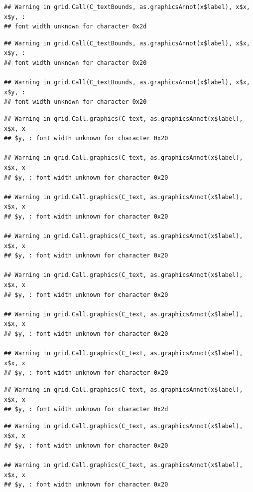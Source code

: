 \documentclass[]{article}
\theoremstyle{definition}
\theoremstyle{definition}
\theoremstyle{definition}
\theoremstyle{remark}
\begin{document}
\begin{verbatim}
## Warning in grid.Call(C_textBounds, as.graphicsAnnot(x$label), x$x, x$y, :
## font width unknown for character 0x2d
\end{verbatim}

\begin{verbatim}
## Warning in grid.Call(C_textBounds, as.graphicsAnnot(x$label), x$x, x$y, :
## font width unknown for character 0x20

## Warning in grid.Call(C_textBounds, as.graphicsAnnot(x$label), x$x, x$y, :
## font width unknown for character 0x20
\end{verbatim}

\begin{verbatim}
## Warning in grid.Call.graphics(C_text, as.graphicsAnnot(x$label), x$x, x
## $y, : font width unknown for character 0x20

## Warning in grid.Call.graphics(C_text, as.graphicsAnnot(x$label), x$x, x
## $y, : font width unknown for character 0x20

## Warning in grid.Call.graphics(C_text, as.graphicsAnnot(x$label), x$x, x
## $y, : font width unknown for character 0x20

## Warning in grid.Call.graphics(C_text, as.graphicsAnnot(x$label), x$x, x
## $y, : font width unknown for character 0x20

## Warning in grid.Call.graphics(C_text, as.graphicsAnnot(x$label), x$x, x
## $y, : font width unknown for character 0x20

## Warning in grid.Call.graphics(C_text, as.graphicsAnnot(x$label), x$x, x
## $y, : font width unknown for character 0x20

## Warning in grid.Call.graphics(C_text, as.graphicsAnnot(x$label), x$x, x
## $y, : font width unknown for character 0x20
\end{verbatim}

\begin{verbatim}
## Warning in grid.Call.graphics(C_text, as.graphicsAnnot(x$label), x$x, x
## $y, : font width unknown for character 0x2d
\end{verbatim}

\begin{verbatim}
## Warning in grid.Call.graphics(C_text, as.graphicsAnnot(x$label), x$x, x
## $y, : font width unknown for character 0x20

## Warning in grid.Call.graphics(C_text, as.graphicsAnnot(x$label), x$x, x
## $y, : font width unknown for character 0x20
\end{verbatim}
\end{document}
